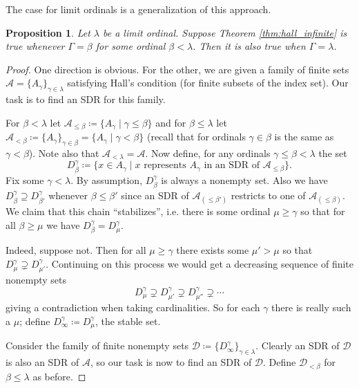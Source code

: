 \documentclass{article}
\theoremstyle{definition}
\theoremstyle{plain}
\newtheorem{prop}[thm]{Proposition}
\theoremstyle{definition}
\begin{document}
 	The case for limit ordinals is a generalization of this approach.
 	\begin{prop}
 		Let $\lambda$ be a limit ordinal. Suppose Theorem \ref{thm:hall_infinite} is true whenever $\Gamma = \beta$ for some ordinal $\beta<\lambda$. Then it is also true when $\Gamma = \lambda$.
 	\end{prop}
 	\begin{proof}
 		One direction is obvious. For the other, we are given a family of finite sets $\mathcal{A}=\{A_{\gamma}\}_{\gamma\in\lambda}$ satisfying Hall's condition (for finite subsets of the index set). Our task is to find an SDR for this family.
 		
 		For $\beta<\lambda$ let $\mathcal{A}_{\leq\beta} \coloneqq \{A_{\gamma}\mid \gamma \leq \beta\}$ and for $\beta \leq \lambda$ let $\mathcal{A}_{< \beta} \coloneqq\{A_{\gamma}\}_{\gamma \in \beta} = \{A_{\gamma}\mid \gamma < \beta\}$ (recall that for ordinals $\gamma \in \beta$ is the same as $\gamma < \beta$). Note also that $\mathcal{A}_{<\lambda} = \mathcal{A}$. Now define, for any ordinals $\gamma \leq \beta < \lambda$ the set
 		\[
 			D^{\gamma}_{\beta}\coloneqq \{x\in A_{\gamma} \mid x \text{ represents $A_{\gamma}$ in an SDR of $\mathcal{A}_{\leq\beta}$}\}.
 		\]
 		Fix some $\gamma< \lambda$.	By assumption, $D_{\beta}^{\gamma}$ is always a nonempty set. Also we have $D_{\beta}^{\gamma} \supseteq D_{\beta'}^{\gamma}$ whenever $\beta\leq \beta'$ since an SDR of $\mathcal{A}_{(\leq \beta')}$ restricts to one of $\mathcal{A}_{(\leq \beta)}$. We claim that this chain ``stabilizes'', i.e. there is some ordinal $\mu\geq \gamma$ so that for all $\beta \geq \mu$ we have $D_{\beta}^{\gamma} = D_{\mu}^{\gamma}$. 
 		
 		Indeed, suppose not. Then for all $\mu\geq \gamma$ there exists some $\mu' > \mu$ so that $D_{\mu}^{\gamma} \supsetneq D_{\mu'}^{\gamma}$. Continuing on this process we would get a decreasing sequence of finite nonempty sets
 		\[
 			D^{\gamma}_{\mu} \supsetneq D^{\gamma}_{\mu'} \supsetneq D^{\gamma}_{\mu''}\supsetneq \cdots
 		\]
 		giving a contradiction when taking cardinalities. So for each $\gamma$ there is really such a $\mu$; define $D^{\gamma}_{\infty} \coloneqq D^{\gamma}_{\mu}$, the stable set.
 		
 		Consider the family of finite nonempty sets $\mathcal{D} \coloneqq \{D^{\gamma}_{\infty}\}_{\gamma \in \lambda}$. Clearly an SDR of $\mathcal{D}$ is also an SDR of $\mathcal{A}$, so our task is now to find an SDR of $\mathcal{D}$. Define $\mathcal{D}_{< \beta}$ for $\beta \leq \lambda$ as before.
 		

\end{proof}
\end{document}
